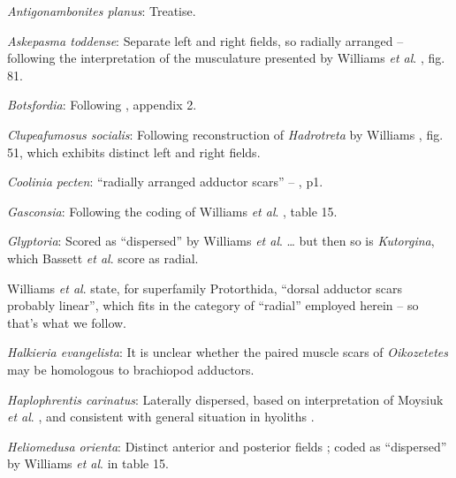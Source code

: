 \documentclass[openany]{book}
\theoremstyle{definition}
\theoremstyle{definition}
\theoremstyle{definition}
\theoremstyle{remark}
\begin{document}
\hypertarget{Antigonambonites_planus-coding-17}{}
\emph{Antigonambonites planus}: Treatise.

\hypertarget{Askepasma_toddense-coding-17}{}
\emph{Askepasma toddense}: Separate left and right fields, so radially
arranged -- following the interpretation of the musculature presented by
Williams \emph{et al}.
\citeyearpar{Williams2000LinguliformeaCraniiformea}, fig. 81.

\hypertarget{Botsfordia-coding-17}{}
\emph{Botsfordia}: Following \citet{Williams1998Thediversity}, appendix
2.

\hypertarget{Clupeafumosus_socialis-coding-17}{}
\emph{Clupeafumosus socialis}: Following reconstruction of
\emph{Hadrotreta} by Williams
\citeyearpar{Williams2000LinguliformeaCraniiformea}, fig. 51, which
exhibits distinct left and right fields.

\hypertarget{Coolinia_pecten-coding-17}{}
\emph{Coolinia pecten}: ``radially arranged adductor scars'' --
\citet{Bassett2017Earliestontogeny}, p1.

\hypertarget{Gasconsia-coding-17}{}
\emph{Gasconsia}: Following the coding of Williams \emph{et al}.
\citeyearpar{Williams2000LinguliformeaCraniiformea}, table 15.

\hypertarget{Glyptoria-coding-17}{}
\emph{Glyptoria}: Scored as ``dispersed'' by Williams \emph{et al}.
\citeyearpar{Williams1998Thediversity} \ldots{} but then so is
\emph{Kutorgina}, which Bassett \emph{et al}.
\citeyearpar{Bassett2001Functionalmorphology} score as radial.

Williams \emph{et al}.
\citeyearpar{Williams2000LinguliformeaCraniiformea} state, for
superfamily Protorthida, ``dorsal adductor scars probably linear'',
which fits in the category of ``radial'' employed herein -- so that's
what we follow.

\hypertarget{Halkieria_evangelista-coding-17}{}
\emph{Halkieria evangelista}: It is unclear whether the paired muscle
scars of \emph{Oikozetetes} may be homologous to brachiopod adductors.

\hypertarget{Haplophrentis_carinatus-coding-17}{}
\emph{Haplophrentis carinatus}: Laterally dispersed, based on
interpretation of Moysiuk \emph{et al}.
\citeyearpar{Moysiuk2017Hyolithsare}, and consistent with general
situation in hyoliths \citep[see][]{Dzik1980Ontogenyof}.

\hypertarget{Heliomedusa_orienta-coding-17}{}
\emph{Heliomedusa orienta}: Distinct anterior and posterior fields
\citep{Chen2007Reinterpretationof}; coded as ``dispersed'' by Williams
\emph{et al}. \citeyearpar{Williams2000LinguliformeaCraniiformea} in
table 15.
\end{document}
